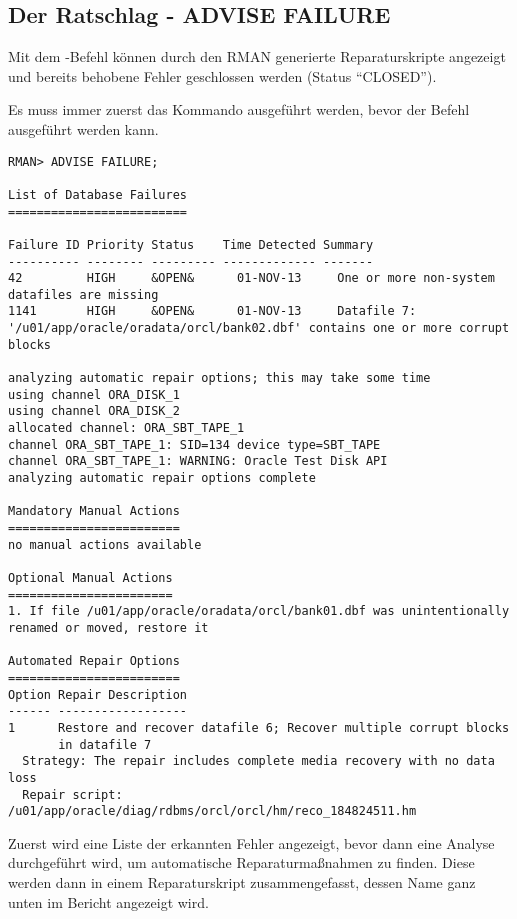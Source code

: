       \subsection{Der Ratschlag - ADVISE FAILURE}
        Mit dem -Befehl k\"onnen durch den RMAN generierte Reparaturskripte angezeigt und bereits behobene Fehler geschlossen werden (Status \enquote{CLOSED}).
        \begin{merke}
          Es muss immer zuerst das Kommando  ausgef\"uhrt werden, bevor der Befehl  ausgef\"uhrt werden kann.
        \end{merke}

        \begin{lstlisting}[caption={Das Kommando \languagerman{ADVISE FAILURE}},label=admin1539,language=rman]
RMAN> ADVISE FAILURE;

List of Database Failures
=========================

Failure ID Priority Status    Time Detected Summary
---------- -------- --------- ------------- -------
42         HIGH     &OPEN&      01-NOV-13     One or more non-system
datafiles are missing
1141       HIGH     &OPEN&      01-NOV-13     Datafile 7:
'/u01/app/oracle/oradata/orcl/bank02.dbf' contains one or more corrupt blocks

analyzing automatic repair options; this may take some time
using channel ORA_DISK_1
using channel ORA_DISK_2
allocated channel: ORA_SBT_TAPE_1
channel ORA_SBT_TAPE_1: SID=134 device type=SBT_TAPE
channel ORA_SBT_TAPE_1: WARNING: Oracle Test Disk API
analyzing automatic repair options complete

Mandatory Manual Actions
========================
no manual actions available

Optional Manual Actions
=======================
1. If file /u01/app/oracle/oradata/orcl/bank01.dbf was unintentionally
renamed or moved, restore it

Automated Repair Options
========================
Option Repair Description
------ ------------------
1      Restore and recover datafile 6; Recover multiple corrupt blocks
       in datafile 7
  Strategy: The repair includes complete media recovery with no data loss
  Repair script: /u01/app/oracle/diag/rdbms/orcl/orcl/hm/reco_184824511.hm
        \end{lstlisting}
        Zuerst wird eine Liste der erkannten Fehler angezeigt, bevor dann eine Analyse durchgef\"uhrt wird, um automatische Reparaturma\ss{}nahmen zu finden. Diese werden dann in einem Reparaturskript zusammengefasst, dessen Name ganz unten im Bericht angezeigt wird.

